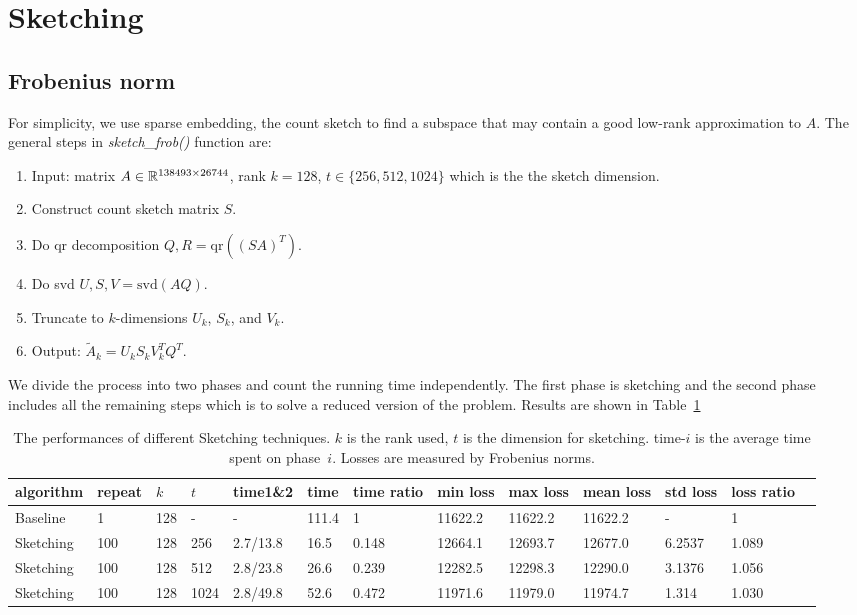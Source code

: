 \section{Sketching}

\subsection{Frobenius norm}
For simplicity, we use sparse embedding, \ie the count sketch
to find a subspace that may contain a good low-rank approximation to $A$.
The general steps in \textit{sketch\_frob()} function are:
\begin{enumerate}
    \item Input: matrix $A\in {\mathbb{R}}^{138493\times 26744}$,
        rank $k=128$,
        $t\in\{256, 512, 1024\}$ which is the the sketch dimension.
    \item Construct count sketch matrix $S$.
    \item Do qr decomposition $Q, R = \text{qr}((SA)^T)$.
    \item Do svd $U, S, V = \text{svd}(AQ)$.
    \item Truncate to $k$-dimensions $U_k$, $S_k$, and $V_k$.
    \item Output: $\tilde{A}_k = U_k S_k V_k^T Q^T$.
\end{enumerate}

We divide the process into two phases and count the running time independently.
The first phase is sketching and
the second phase includes all the remaining steps
which is to solve a reduced version of the problem.
Results are shown in Table~\ref{tab:frob}

\begin{table}[htb]
  \setlength{\tabcolsep}{2.6pt}
  \caption{The performances of different Sketching techniques.
  $k$ is the rank used, $t$ is the dimension for sketching.
  time-$i$ is the average time spent on phase~$i$.
  Losses are measured by Frobenius norms.
    }
  \label{tab:frob}
  \centering
  {\small
  \begin{tabular}{lllllllllllll}
    \toprule
    algorithm & repeat & $k$ & $t$ & time1\&2 & time & time ratio & min loss & max loss & mean loss & std loss & loss ratio \\
    \midrule
    Baseline & 1 & 128 & - & - & 111.4 & 1 & 11622.2 & 11622.2 & 11622.2 & - & 1 \\
    Sketching & 100 & 128 & 256 & 2.7/13.8 & 16.5 & 0.148 & 12664.1 & 12693.7 & 12677.0 & 6.2537 & 1.089 \\
    Sketching & 100 & 128 & 512 & 2.8/23.8 & 26.6 & 0.239 & 12282.5 & 12298.3 & 12290.0 & 3.1376 & 1.056 \\
    Sketching & 100 & 128 & 1024 & 2.8/49.8 & 52.6 & 0.472 & 11971.6 & 11979.0 & 11974.7 & 1.314 & 1.030 \\
    \bottomrule
  \end{tabular}
  }
\end{table}
